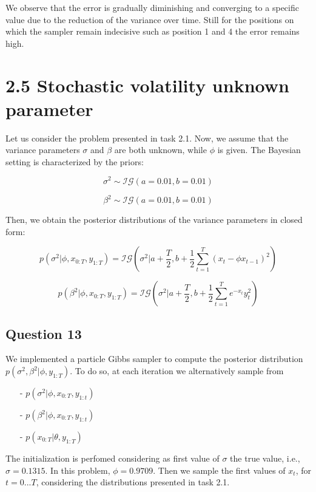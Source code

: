 \documentclass[]{article}
\begin{document}
	We observe that the error is gradually diminishing and converging to a specific value due to the reduction of the variance over time. Still for the positions on which the sampler remain indecisive such as position 1 and 4 the error remains high. 
	
	\newpage
	
	
	\section*{2.5 Stochastic volatility unknown parameter}
	
	Let us consider the problem presented in task 2.1. Now, we assume that the variance parameters $\sigma$ and $\beta$ are both unknown, while $\phi$ is given. The Bayesian setting is characterized by the priors:
	
	$$\sigma^2 \sim \mathcal{IG}(a=0.01, b=0.01)$$
	
	$$\beta^2 \sim \mathcal{IG}(a=0.01, b=0.01)$$
	
	Then, we obtain the posterior distributions of the variance parameters in closed form:
	
	$$ p(\sigma^2|\phi, x_{0:T}, y_{1:T}) = \mathcal{IG}(\sigma^2|a+\frac{T}{2}, b+\frac{1}{2}\sum_{t=1}^{T}(x_t-\phi x_{t-1})^2) $$
	
	$$p(\beta^2|\phi, x_{0:T}, y_{1:T}) = \mathcal{IG}(\sigma^2|a+\frac{T}{2}, b+\frac{1}{2}\sum_{t=1}^{T}e^{-x_t}y_t^2)$$
	
	
	\subsection*{Question 13}
	
	We implemented a particle Gibbs sampler to compute the posterior distribution $p(\sigma^2, \beta^2|\phi, y_{1:T})$. To do so, at each iteration we alternatively sample from
	
	\begin{enumerate}
		
		\item[-] $p(\sigma^2|\phi, x_{0:T}, y_{1:t})$
		
		\item[-] $p(\beta^2|\phi, x_{0:T}, y_{1:t})$
		
		\item[-] $p(x_{0:T}|\theta, y_{1:T})$
		
	\end{enumerate}
	
	The initialization is perfomed considering as first value of $\sigma$ the true value, i.e., $\sigma = 0.1315$. In this problem, $\phi = 0.9709$. Then we sample the first values of $x_t$, for $t=0...T$, considering the distributions presented in task 2.1.
	
\end{document}
